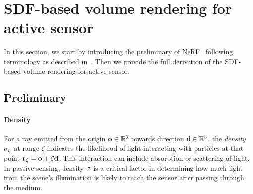 \clearpage
\section{SDF-based volume rendering for active sensor}\label{sec:sup_sdf_vol_render}
In this section, we start by introducing the preliminary of NeRF~\cite{mildenhall2020nerf} following terminology as described in~\cite{tagliasacchi2022volume}. Then we provide the full derivation of the SDF-based volume rendering for active sensor. 

\subsection{Preliminary}\label{sec:supp_pre}
\paragraph{Density}
For a ray emitted from the origin $\mathbf{o} \in \mathbb{R}^3$ towards direction $\mathbf{d} \in \mathbb{R}^3$, the \textit{density} $\sigma_\zeta$ at range $\zeta$ indicates the likelihood of light interacting with particles at that point $\mathbf{r}_\zeta = \mathbf{o} + \zeta \mathbf{d}$. This interaction can include absorption or scattering of light. In passive sensing, density $\sigma$ is a critical factor in determining how much light from the scene's illumination is likely to reach the sensor after passing through the medium.
